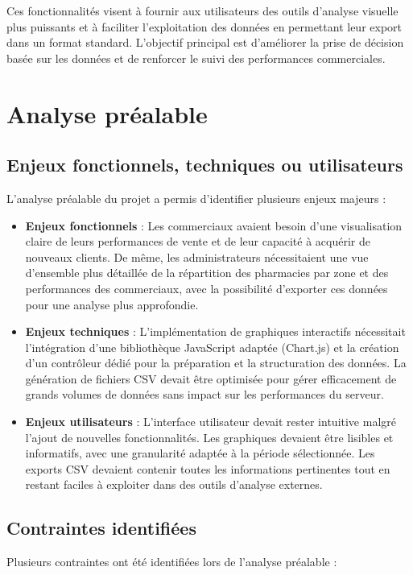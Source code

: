 \documentclass[a4paper,12pt]{report}
\begin{document}
  Ces fonctionnalités visent à fournir aux utilisateurs des outils d'analyse visuelle plus puissants et à faciliter l'exploitation des données en permettant leur export dans un format standard. L'objectif principal est d'améliorer la prise de décision basée sur les données et de renforcer le suivi des performances commerciales.

\section{Analyse préalable}
  \subsection{Enjeux fonctionnels, techniques ou utilisateurs}
  L'analyse préalable du projet a permis d'identifier plusieurs enjeux majeurs :
  
  \begin{itemize}
    \item \textbf{Enjeux fonctionnels} : Les commerciaux avaient besoin d'une visualisation claire de leurs performances de vente et de leur capacité à acquérir de nouveaux clients. De même, les administrateurs nécessitaient une vue d'ensemble plus détaillée de la répartition des pharmacies par zone et des performances des commerciaux, avec la possibilité d'exporter ces données pour une analyse plus approfondie.
    
    \item \textbf{Enjeux techniques} : L'implémentation de graphiques interactifs nécessitait l'intégration d'une bibliothèque JavaScript adaptée (Chart.js) et la création d'un contrôleur dédié pour la préparation et la structuration des données. La génération de fichiers CSV devait être optimisée pour gérer efficacement de grands volumes de données sans impact sur les performances du serveur.
    
    \item \textbf{Enjeux utilisateurs} : L'interface utilisateur devait rester intuitive malgré l'ajout de nouvelles fonctionnalités. Les graphiques devaient être lisibles et informatifs, avec une granularité adaptée à la période sélectionnée. Les exports CSV devaient contenir toutes les informations pertinentes tout en restant faciles à exploiter dans des outils d'analyse externes.
  \end{itemize}

  \subsection{Contraintes identifiées}
  Plusieurs contraintes ont été identifiées lors de l'analyse préalable :
  
\end{document}
